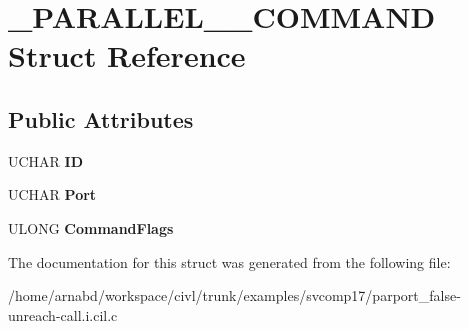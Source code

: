 \hypertarget{struct__PARALLEL__1284__COMMAND}{}\section{\+\_\+\+P\+A\+R\+A\+L\+L\+E\+L\+\_\+\_\+\+C\+O\+M\+M\+A\+N\+D Struct Reference}
\label{struct__PARALLEL__1284__COMMAND}
\subsection*{Public Attributes}
\begin{DoxyCompactItemize}
\item 
\hypertarget{struct__PARALLEL__1284__COMMAND_a2ef26ac4bceee027ed82ba68d0f92f63}{}U\+C\+H\+A\+R {\bfseries I\+D}\label{struct__PARALLEL__1284__COMMAND_a2ef26ac4bceee027ed82ba68d0f92f63}

\item 
\hypertarget{struct__PARALLEL__1284__COMMAND_ae26b8b4c69b5759eacbed86e515e310f}{}U\+C\+H\+A\+R {\bfseries Port}\label{struct__PARALLEL__1284__COMMAND_ae26b8b4c69b5759eacbed86e515e310f}

\item 
\hypertarget{struct__PARALLEL__1284__COMMAND_a6f3d78cbd9140f5dd379a5c34163b956}{}U\+L\+O\+N\+G {\bfseries Command\+Flags}\label{struct__PARALLEL__1284__COMMAND_a6f3d78cbd9140f5dd379a5c34163b956}

\end{DoxyCompactItemize}


The documentation for this struct was generated from the following file\+:\begin{DoxyCompactItemize}
\item 
/home/arnabd/workspace/civl/trunk/examples/svcomp17/parport\+\_\+false-\/unreach-\/call.\+i.\+cil.\+c\end{DoxyCompactItemize}
